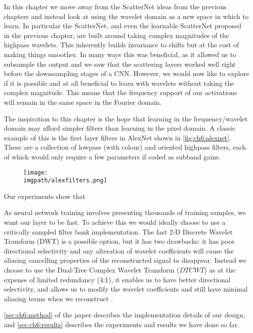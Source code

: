 In this chapter we move away from the ScatterNet ideas from the previous 
chapters and instead look at using the wavelet domain as a new space in which to
learn. In particular the ScatterNet, and even the learnable ScatterNet proposed
in the previous chapter, are built around taking complex magnitudes of the
highpass wavelets. This inherently builds invariance to shifts but at the cost
of making things smoother. In many ways this was beneficial, as it allowed us to
subsample the output and we saw that the scattering layers worked well right
before the downsampling stages of a CNN\@. However, we would now like to explore
if it is possible and at all beneficial to learn with wavelets without taking
the complex magnitude. This means that the frequency support of our activations
will remain in the same space in the Fourier domain. 

The inspiration to this chapter is the hope that learning in the
frequency/wavelet domain may afford simpler filters than learning in the pixel
domain. A classic example of this is the first layer filters in AlexNet shown in
\autoref{fig:ch6:alexnet}. These are a collection of lowpass (with colour) and
oriented highpass filters, each of which would only require a few parameters if
coded as subband gains.

\begin{figure}[bt]
  \centering
  \texttt{[image: \\imgpath/alexfilters.png]}
  \label{fig:ch6:alexnet}
\end{figure}

Our experiments show that \ellipsis

As neural network training involves presenting thousands of training samples, we
want our layer to be fast. To achieve this we would ideally choose to use
a critically sampled filter bank implementation. The fast 2-D Discrete Wavelet
Transform (DWT) is a possible option, but it has two drawbacks: it has poor
directional selectivity and any alteration of wavelet coefficients will cause
the aliasing cancelling properties of the reconstructed signal to disappear.
Instead we choose to use the Dual-Tree Complex Wavelet Transform ($DTCWT$)
\cite{selesnick_dual-tree_2005} as at the expense of limited redundancy (4:1),
it enables us to have better directional selectivity, and allows us to modify
the wavelet coefficients and still have minimal aliasing terms when we
reconstruct \cite{kingsbury_complex_2001}.

\autoref{sec:ch6:method} of the paper describes the implementation details of
our design, and \autoref{sec:ch6:results} describes the experiments and results
we have done so far.
